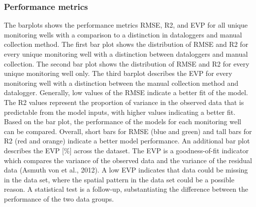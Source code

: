 \clearpage
\subsubsection{Performance metrics}
The barplots shows the performance metrics RMSE, R2, and EVP for all unique monitoring wells with a comparison to a distinction in dataloggers and manual collection method. The first bar plot shows the distribution of RMSE and R2 for every unique monitoring well with a distinction between dataloggers and manual collection. The second bar plot shows the distribution of RMSE and R2 for every unique monitoring well only. The third barplot describes the EVP for every monitoring well with a distinction between the manual collection method and datalogger. Generally, low values of the RMSE indicate a better fit of the model. The R2 values represent the proportion of variance in the observed data that is predictable from the model inputs, with higher values indicating a better fit. Based on the bar plot, the performance of the models for each monitoring well can be compared. Overall, short bars for RMSE (blue and green) and tall bars for R2 (red and orange) indicate a better model performance. An additional bar plot describes the EVP [\%] across the dataset. The EVP is a goodness-of-fit indicator which compares the variance of the observed data and the variance of the residual data (Asmuth von et al., 2012). A low EVP indicates that data could be missing in the data set, where the spatial pattern in the data set could be a possible reason. A statistical test is a follow-up, substantiating the difference between the performance of the two data groups.



